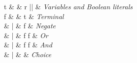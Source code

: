 \begin{syntax}

  t & \Coloneqq & r \quad|\quad \tru \quad|\quad \fls
    & \textit{Variables and Boolean literals} \\[1.5ex]

  f & \Coloneqq & t    & \textit{Terminal} \\
    & | & \neg f       & \textit{Negate} \\
    & | & f \vee f     & \textit{Or} \\
    & | & f \wedge f   & \textit{And} \\
    & | &  & \textit{Choice} \\
\end{syntax}
